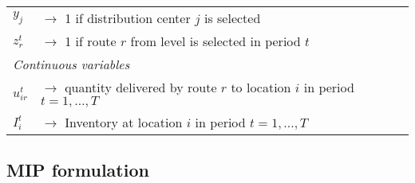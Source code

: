 \documentclass[10pt, a4paper]{article}
\begin{document}
\begin{table}
\begin{tabular}{ll}
        $y_{j}$ & $\rightarrow$ 1 if distribution center $j$ is selected \\
        $z^t_{r}$ & $\rightarrow$ 1 if route $r$ from level is selected in period $t$\\
        \hline
        \multicolumn{2}{l}{\textit{Continuous variables}}\\
        $u^t_{ir}$ & $\rightarrow$ quantity delivered by route $r$ to location $i$ in period $t=1,\ldots,T$\\
        $I^t_i$ & $\rightarrow$ Inventory at location $i$ in period $t=1,\ldots,T$\\
        \hline
    \end{tabular}
\end{table}

\subsection{MIP formulation}\label{subsection:MIP}
\end{document}
